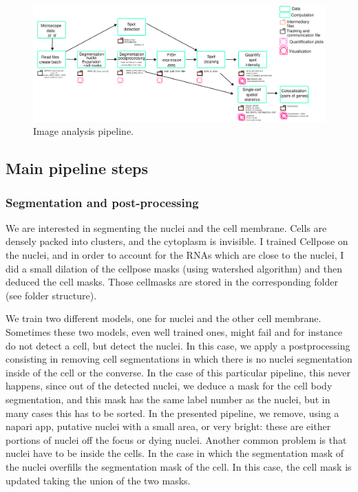 \documentclass[24pt]{article}
\begin{document}
 \begin{figure}[h!] %
  \centering
  \includegraphics[width=1\textwidth]{HOX_pipeline.png} %
  \caption{Image analysis pipeline.}
  \label{fig:my_image} %
\end{figure}
 
  \newpage
 
\subsection{Main pipeline steps} 

\subsubsection{Segmentation and post-processing}
 
 We are interested in segmenting the nuclei and the cell membrane. Cells are densely packed into clusters, and the cytoplasm is invisible. I  trained Cellpose on the nuclei, and in order to account for the RNAs which are close to the nuclei, I did a small dilation of the cellpose masks (using watershed algorithm) and then deduced the cell masks. Those cellmasks are stored in the corresponding folder (see folder  structure).

We train two different models, one for nuclei and the other cell membrane.   Sometimes these two models, even well trained ones, might fail and for instance do not detect a cell,  but detect the  nuclei. In this case, we apply a postprocessing consisting in removing cell segmentations in which there is no nuclei segmentation inside of the cell or the converse. In the case of this particular pipeline, this never happens, since out of the detected nuclei, we deduce a mask for the cell body segmentation, and this mask has the same label number as the nuclei, but in many cases this has to be sorted. In the presented pipeline, we remove, using a napari app, putative nuclei with a small area, or very bright: these are either portions of nuclei off the focus or dying nuclei. Another common problem is that nuclei have to be inside the cells. In the case in which the segmentation mask  of the nuclei overfills the segmentation mask of the cell. In this case, the cell mask is updated taking the union of the two masks. 
 
\end{document}
